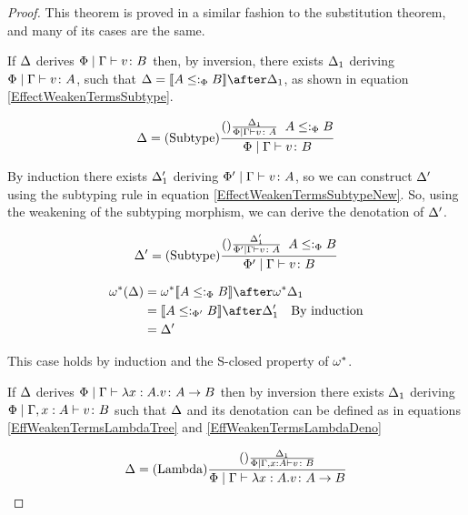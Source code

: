 \documentclass{Report}
\begin{document}
\begin{proof}
    This theorem is proved in a similar fashion to the substitution theorem, and many of its cases are the same.


    If $\Delta$ derives $\Phi\mid\Gamma \vdash v \colon B$ then, by inversion, there exists $\Delta_1$ deriving $\Phi\mid\Gamma \vdash v \colon A$, such that $ \D = \deno{A\subtypep B}\after \D_1$, as shown in equation \ref{EffectWeakenTermsSubtype}.

    \begin{equation}
        \label{EffectWeakenTermsSubtype}
        \Delta = (\text{Subtype}) \frac{(\text{}) \frac{\Delta_1}{\Phi\mid\Gamma \vdash v \colon A}\;\; A \leq:_\Phi B}{\Phi\mid\Gamma \vdash v \colon B}
    \end{equation}

    By induction there exists $\Delta_1'$ deriving $\Phi'\mid\Gamma \vdash v \colon A$, so we can construct $\Delta'$ using the subtyping rule in equation \ref{EffectWeakenTermsSubtypeNew}.
    So, using the weakening of the subtyping morphism, we can derive the denotation of $\Delta'$.

    \begin{equation}
        \label{EffectWeakenTermsSubtypeNew}
        \Delta' = (\text{Subtype}) \frac{(\text{}) \frac{\Delta_1'}{\Phi'\mid\Gamma \vdash v \colon A}\;\; A \leq:_\Phi B}{\Phi'\mid\Gamma \vdash v \colon B}
    \end{equation}

    \begin{align}
        \w\star(\D) & = \w\star{\deno{A\subtypep B}}\after\w\star\D_1 \\
        & = \deno{A\subtypepp B}\after\D_1'\qt{By induction}\\
        & = \D'
    \end{align}
    
    This case holds by induction and the S-closed property of $\omega^*$.

    If $\Delta$ derives $\Phi\mid\Gamma \vdash \lambda x : A. v \colon A\rightarrow B$ then by inversion there exists $\Delta_1$ deriving $\Phi\mid\Gamma, x: A \vdash v \colon B$ such that $\Delta$ and its denotation can be defined as in equations \ref{EffWeakenTermsLambdaTree} and \ref{EffWeakenTermsLambdaDeno}
    

    \begin{equation}
        \label{EffWeakenTermsLambdaTree}
        \Delta = (\text{Lambda}) \frac{
            (\text{}) \frac{\Delta_1}{\Phi\mid\Gamma, x: A \vdash v \colon B}
        }{\Phi\mid\Gamma \vdash \lambda x : A. v \colon A\rightarrow B}
    \end{equation}



\end{proof}
\end{document}
